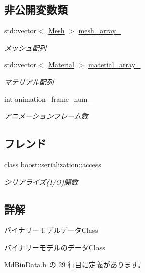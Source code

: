 \subsection*{非公開変数類}
\begin{DoxyCompactItemize}
\item 
std\+::vector$<$ \mbox{\hyperlink{class_md_bin_data_1_1_mesh}{Mesh}} $>$ \mbox{\hyperlink{class_md_bin_data_aefce3cdcd6dcdf388c936ade62c6b9fa}{mesh\+\_\+array\+\_\+}}
\begin{DoxyCompactList}\small\item\em メッシュ配列 \end{DoxyCompactList}\item 
std\+::vector$<$ \mbox{\hyperlink{class_md_bin_data_1_1_material}{Material}} $>$ \mbox{\hyperlink{class_md_bin_data_a2e418d4749d2154ca1c22cdb8ee99740}{material\+\_\+array\+\_\+}}
\begin{DoxyCompactList}\small\item\em マテリアル配列 \end{DoxyCompactList}\item 
int \mbox{\hyperlink{class_md_bin_data_a71825485140228ce2ae106cc1133be0a}{animation\+\_\+frame\+\_\+num\+\_\+}}
\begin{DoxyCompactList}\small\item\em アニメーションフレーム数 \end{DoxyCompactList}\end{DoxyCompactItemize}
\subsection*{フレンド}
\begin{DoxyCompactItemize}
\item 
class \mbox{\hyperlink{class_md_bin_data_ac98d07dd8f7b70e16ccb9a01abf56b9c}{boost\+::serialization\+::access}}
\begin{DoxyCompactList}\small\item\em シリアライズ(I/O)関数 \end{DoxyCompactList}\end{DoxyCompactItemize}


\subsection{詳解}
バイナリーモデルデータ\+Class 

バイナリーモデルのデータ\+Class 

 Md\+Bin\+Data.\+h の 29 行目に定義があります。



